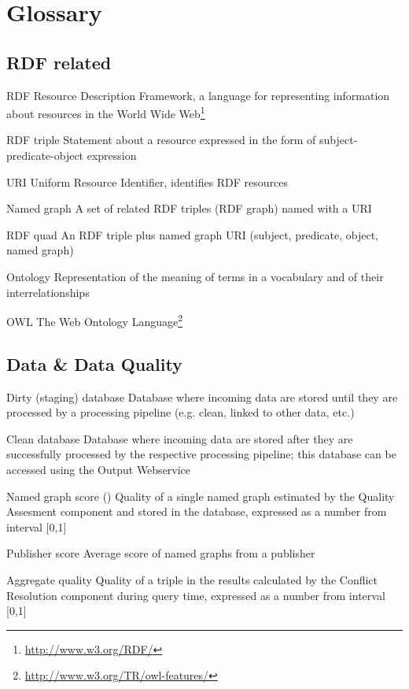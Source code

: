 



\appendix

\chapter{Glossary}

\section*{RDF related}
\begin{glossarylist}
	\item[RDF] Resource Description Framework, a language for representing information about resources in the World Wide Web\footnote{\url{http://www.w3.org/RDF/}}
	\item[RDF triple] Statement about a resource expressed in the form of subject-predicate-object expression
	\item[URI] Uniform Resource Identifier, identifies RDF resources
	\item[Named graph] A set of related RDF triples (RDF graph) named with a URI
	\item[RDF quad] An RDF triple plus named graph URI (subject, predicate, object, named graph)
	\item[Ontology] Representation of the meaning of terms in a vocabulary and of their interrelationships
	\item[OWL] The Web Ontology Language\footnote{\url{http://www.w3.org/TR/owl-features/}}
\end{glossarylist}

\section*{Data \& Data Quality}
\begin{glossarylist}
	\item[Dirty (staging) database] Database where incoming data are stored until they are processed by a processing pipeline (e.g. clean, linked to other data, etc.)
	\item[Clean database] Database where incoming data are stored after they are successfully processed by the respective processing pipeline; this database can be accessed using the Output Webservice
	\item[Named graph score (\code{odcs:score})] Quality of a single named graph estimated by the Quality Assesment component and stored in the database, expressed as a number from interval [0,1]
	\item[Publisher score] Average score of named graphs from a publisher
	\item[Aggregate quality] Quality of a triple in the results calculated by the Conflict Resolution component during query time, expressed as a number from interval [0,1]
\end{glossarylist}

